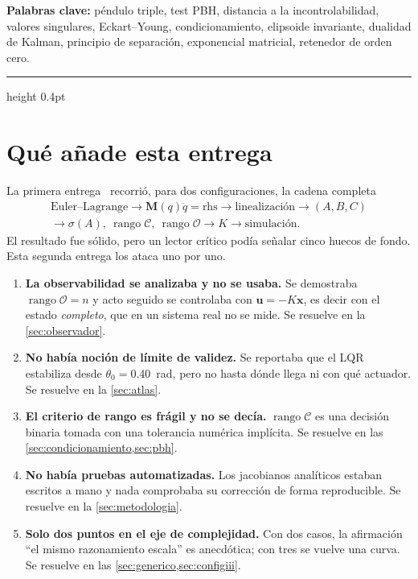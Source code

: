 \documentclass[11pt,letterpaper]{article}
\theoremstyle{definition}
\theoremstyle{plain}
\theoremstyle{remark}
\DeclareMathOperator{\rank}{rango}
\newcommand{\spec}{\sigma}
\newcommand{\calC}{\mathcal{C}}
\newcommand{\calO}{\mathcal{O}}
\newcommand{\xv}{\bm{x}}
\newcommand{\uv}{\bm{u}}
\newcommand{\Mm}{\bm{M}}
\begin{document}
\vspace{0.3em}
\noindent\textbf{Palabras clave:}\;
péndulo triple, test PBH, distancia a la incontrolabilidad, valores singulares,
Eckart--Young, condicionamiento, elipsoide invariante, dualidad de Kalman,
principio de separación, exponencial matricial, retenedor de orden cero.
\vspace{0.8em}
\hrule height 0.4pt
\vspace{1.0em}

\section{Qué añade esta entrega}
\label{sec:problema}

La primera entrega~\cite{entrega1} recorrió, para dos configuraciones, la cadena
completa
\[
\begin{gathered}
\text{Euler--Lagrange} \to \Mm(q)\ddot q=\text{rhs} \to \text{linealización} \to (A,B,C)\\
\to \spec(A),\ \rank\calC,\ \rank\calO \to K \to \text{simulación}.
\end{gathered}
\]
El resultado fue sólido, pero un lector crítico podía señalar cinco huecos de
fondo. Esta segunda entrega los ataca uno por uno.

\begin{enumerate}
  \item \textbf{La observabilidad se analizaba y no se usaba.} Se demostraba
  $\rank\calO=n$ y acto seguido se controlaba con $\uv=-K\xv$, es decir con el
  estado \emph{completo}, que en un sistema real no se mide. Se resuelve en la
  \cref{sec:observador}.

  \item \textbf{No había noción de límite de validez.} Se reportaba que el LQR
  estabiliza desde $\theta_0=0.40$~rad, pero no hasta dónde llega ni con qué
  actuador. Se resuelve en la \cref{sec:atlas}.

  \item \textbf{El criterio de rango es frágil y no se decía.} $\rank\calC$ es
  una decisión binaria tomada con una tolerancia numérica implícita. Se resuelve
  en las \cref{sec:condicionamiento,sec:pbh}.

  \item \textbf{No había pruebas automatizadas.} Los jacobianos analíticos
  estaban escritos a mano y nada comprobaba su corrección de forma
  reproducible. Se resuelve en la \cref{sec:metodologia}.

  \item \textbf{Solo dos puntos en el eje de complejidad.} Con dos casos, la
  afirmación ``el mismo razonamiento escala'' es anecdótica; con tres se vuelve
  una curva. Se resuelve en las \cref{sec:generico,sec:configiii}.
\end{enumerate}
\end{document}
